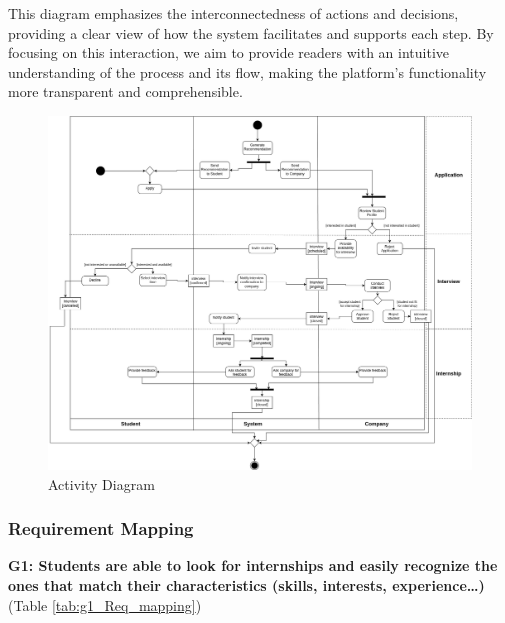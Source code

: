 This diagram emphasizes the interconnectedness of actions and decisions, providing a clear view of how the system facilitates and supports each step. By focusing on this interaction, we aim to provide readers with an intuitive understanding of the process and its flow, making the platform's functionality more transparent and comprehensible.

\begin{figure}[H]
\centering
\includegraphics[width=\textwidth]{Images/activity-diagram.png}
\caption{\label{fig:activity_diagram} Activity Diagram}
\end{figure}


\subsubsection{Requirement Mapping}
\textbf{G1: Students are able to look for internships and easily recognize the ones that match their characteristics (skills, interests, experience…)} (Table \ref{tab:g1_Req_mapping})

